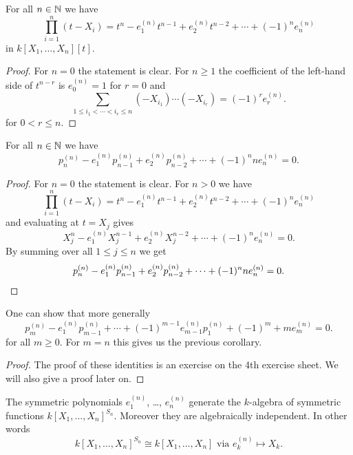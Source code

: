 \begin{lem}
 For all $n \in \mathbb{N}$ we have
 \[
  \prod_{i=1}^n (t-X_i) = t^n - e^{(n)}_1 t^{n-1} + e^{(n)}_2 t^{n-2} + \dotsb + (-1)^n e^{(n)}_n
 \]
 in $k[X_1, \dotsc, X_n][t]$.
\end{lem}
\begin{proof}
 For $n = 0$ the statement is clear. For $n \geq 1$ the coefficient of the left-hand side of $t^{n-r}$ is $e^{(n)}_0 = 1$ for $r = 0$ and
 \[
  \sum_{1 \leq i_1 < \dotsb < i_r \leq n} (-X_{i_1}) \dotsm (-X_{i_r}) = (-1)^r e^{(n)}_r.
 \]
 for $0 < r \leq n$.
\end{proof}


\begin{cor}
 For all $n \in \mathbb{N}$ we have
 \[
  p^{(n)}_n - e^{(n)}_1 p^{(n)}_{n-1} + e^{(n)}_2 p^{(n)}_{n-2} + \dotsb + (-1)^n n e^{(n)}_n = 0.
 \]
\end{cor}
\begin{proof}
 For $n = 0$ the statement is clear. For $n > 0$ we have
 \[
  \prod_{i=1}^n (t-X_i) = t^n - e^{(n)}_1 t^{n-1} + e^{(n)}_2 t^{n-2} + \dotsb + (-1)^n e^{(n)}_n
 \]
 and evaluating at $t = X_j$ gives
 \[
  X_j^n - e^{(n)}_1 X_j^{n-1} + e^{(n)}_2 X_j^{n-2} + \dotsb + (-1)^n e^{(n)}_n = 0.
 \]
 By summing over all $1 \leq j \leq n$ we get
 \[
  p^{(n)}_n - e^{(n)}_1 p^{(n)}_{n-1} + e^{(n)}_2 p^{(n)}_{n-2} + \dotsb + (-1)^n n e^{(n)}_n = 0.
  \qedhere
 \]
\end{proof}


\begin{rem}
 One can show that more generally
 \[
  p^{(n)}_m - e^{(n)}_1 p^{(n)}_{m-1} + \dotsb + (-1)^{m-1} e^{(n)}_{m-1} p^{(n)}_1 + (-1)^m+ m e^{(n)}_m = 0.
 \]
 for all $m \geq 0$. For $m = n$ this gives us the previous corollary.
\end{rem}
\begin{proof}
 The proof of these identities is an exercise on the 4th exercise sheet. We will also give a proof later on.
\end{proof}


\begin{thrm}
 The symmetric polynomials $e^{(n)}_1$, \dots, $e^{(n)}_n$ generate the $k$-algebra of symmetric functions $k[X_1, \dotsc, X_n]^{S_n}$. Moreover they are algebraically independent. In other words
 \[
  k[X_1, \dotsc, X_n]^{S_n} \cong k[X_1, \dotsc, X_n] \text{ via } e^{(n)}_k \mapsto X_k.
 \]
\end{thrm}


